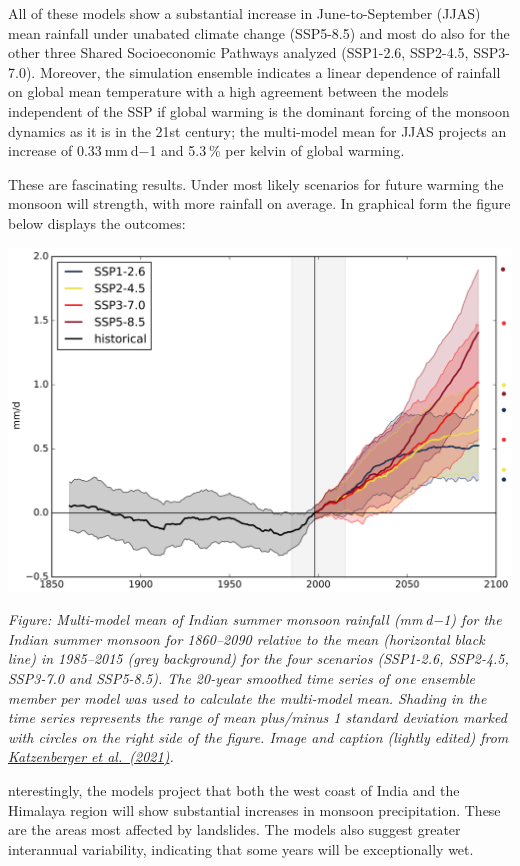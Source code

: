 \documentclass[
]{book}
\begin{document}
All of these models show a substantial increase in June-to-September (JJAS) mean rainfall under unabated climate change (SSP5-8.5) and most do also for the other three Shared Socioeconomic Pathways analyzed (SSP1-2.6, SSP2-4.5, SSP3-7.0). Moreover, the simulation ensemble indicates a linear dependence of rainfall on global mean temperature with a high agreement between the models independent of the SSP if global warming is the dominant forcing of the monsoon dynamics as it is in the 21st century; the multi-model mean for JJAS projects an increase of 0.33 mm d−1 and 5.3 \% per kelvin of global warming.

These are fascinating results. Under most likely scenarios for future warming the monsoon will strength, with more rainfall on average. In graphical form the figure below displays the outcomes:

\includegraphics{fig/petley_monsoon.png}

\emph{Figure: Multi-model mean of Indian summer monsoon rainfall (mm d−1) for the Indian summer monsoon for 1860--2090 relative to the mean (horizontal black line) in 1985--2015 (grey background) for the four scenarios (SSP1-2.6, SSP2-4.5, SSP3-7.0 and SSP5-8.5). The 20-year smoothed time series of one ensemble member per model was used to calculate the multi-model mean. Shading in the time series represents the range of mean plus/minus 1 standard deviation marked with circles on the right side of the figure. Image and caption (lightly edited) from \href{https://esd.copernicus.org/articles/12/367/2021/}{Katzenberger et al.~(2021)}.}

nterestingly, the models project that both the west coast of India and the Himalaya region will show substantial increases in monsoon precipitation. These are the areas most affected by landslides. The models also suggest greater interannual variability, indicating that some years will be exceptionally wet.
\end{document}
